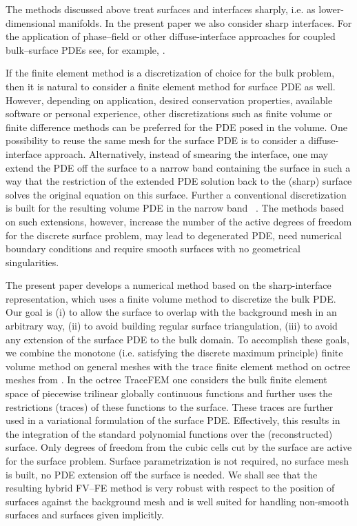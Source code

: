 \documentclass{article}
\begin{document}
The methods discussed above treat surfaces and interfaces sharply, i.e. as lower-dimensional manifolds. In the present paper we also  consider sharp interfaces. For the application of phase--field or other diffuse-interface approaches for coupled bulk--surface PDEs see,  for example, \cite{chen2014conservative,levine2005membrane,teigen2009diffuse}.

If the finite element method is a discretization of choice for the bulk problem, then it is natural to consider a finite element method for surface PDE as well. However,  depending on application, desired conservation properties, available software or personal experience, other discretizations such as finite volume or finite difference methods can be preferred for the PDE posed in the volume.
One possibility to reuse the same mesh for the surface PDE is to consider  a diffuse-interface approach. Alternatively, instead of smearing the interface, one may extend the PDE off the  surface to a narrow band containing the surface
in such a way that the restriction of the extended PDE solution back to the (sharp) surface solves the original equation on this surface. Further a conventional discretization is built for the resulting volume PDE in the narrow band~ \cite{BCOS01,olshanskii2016narrow}. The methods based on such extensions, however, increase the number of the active degrees of freedom for the discrete surface problem, may lead to degenerated PDE, need numerical boundary conditions and require smooth surfaces with no  geometrical singularities.

The present  paper develops a numerical method based on the sharp-interface representation, which uses a finite volume method to discretize the bulk PDE. Our goal is (i) to allow the surface to overlap with the background mesh in an arbitrary way, (ii) to avoid {building regular surface triangulation}, (iii)  to avoid any extension of the surface PDE to the bulk domain.  To accomplish these goals, we combine the monotone (i.e. satisfying the discrete maximum principle) finite volume method on  general meshes  \cite{Lipnikov:12,ChernyshenkoFV7:14}   with the trace finite element method on octree meshes from \cite{chernyshenko2015adaptive}.
In the octree TraceFEM one considers the bulk finite element space of piecewise trilinear globally continuous functions
and further uses the restrictions (traces) of these functions to the surface. These traces are further used in a variational formulation of the surface PDE. Effectively, this results in the integration of the standard polynomial functions over the (reconstructed) surface.  Only degrees of freedom from the cubic cells cut by the
surface are active for the surface problem. Surface parametrization is not required, no surface mesh is built,  no PDE extension off the surface is needed.  We shall see that the resulting hybrid FV--FE method is very robust with respect to the position of surfaces against the background mesh and is well suited for handling non-smooth surfaces and surfaces given implicitly.
\end{document}
